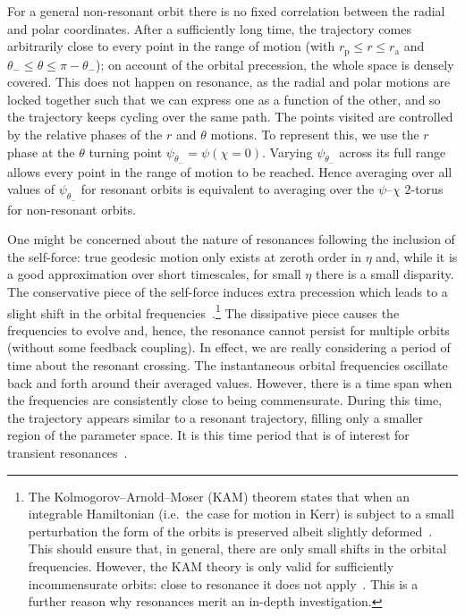 \documentclass[aps,prd,amsfonts,amssymb,amsmath,nofootinbib,showpacs,superscriptaddress,twocolumn,floatfix]{revtex4-1}
\newcommand{\sub}[1]{\ensuremath{_\mathrm{#1}}}
\begin{document}
For a general non-resonant orbit there is no fixed correlation between the radial and polar coordinates. After a sufficiently long time, the trajectory comes arbitrarily close to every point in the range of motion (with $r\sub{p} \leq r \leq r\sub{a}$ and $\theta_- \leq \theta \leq \pi - \theta_-$); on account of the orbital precession, the whole space is densely covered. This does not happen on resonance, as the radial and polar motions are locked together such that we can express one as a function of the other, and so the trajectory keeps cycling over the same path. The points visited are controlled by the relative phases of the $r$ and $\theta$ motions. To represent this, we use the $r$ phase at the $\theta$ turning point $\psi_{\theta_-} = \psi(\chi = 0)$. Varying $\psi_{\theta_-}$ across its full range allows every point in the range of motion to be reached. Hence averaging over all values of $\psi_{\theta_-}$ for resonant orbits is equivalent to averaging over the $\psi$--$\chi$ $2$-torus for non-resonant orbits.

One might be concerned about the nature of resonances following the inclusion of the self-force: true geodesic motion only exists at zeroth order in $\eta$ and, while it is a good approximation over short timescales, for small $\eta$ there is a small disparity. The conservative piece of the self-force induces extra precession which leads to a slight shift in the orbital frequencies~\cite{Warburton2012}.\footnote{The Kolmogorov--Arnold--Moser (KAM) theorem states that when an integrable Hamiltonian (i.e.\ the case for motion in Kerr) is subject to a small perturbation the form of the orbits is preserved albeit slightly deformed~\cite{Arnold1963,Moser1973}. %
This should ensure that, in general, there are only small shifts in the orbital frequencies. However, the KAM theory is only valid for sufficiently incommensurate orbits: close to resonance it does not apply~\cite{Moser1973}. %
This is a further reason why resonances merit an in-depth investigation.}
The dissipative piece causes the frequencies to evolve and, hence, the resonance cannot persist for multiple orbits (without some feedback coupling). In effect, we are really considering a period of time about the resonant crossing. The instantaneous orbital frequencies oscillate back and forth around their averaged values. However, there is a time span when the frequencies are consistently close to being commensurate. During this time, the trajectory appears similar to a resonant trajectory, filling only a smaller region of the parameter space. It is this time period that is of interest for transient resonances~\cite{Bosley1992}.
\end{document}
